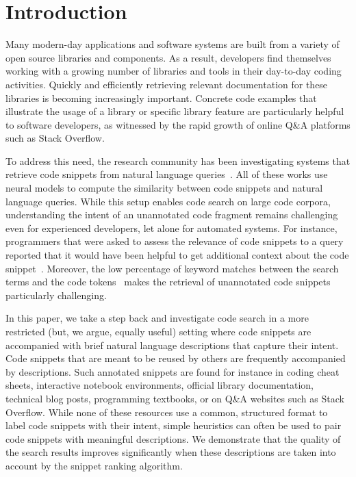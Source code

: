 \documentclass[12pt,conference, onecolumn]{IEEEtran}
\begin{document}
\section{Introduction}
Many modern-day applications and software systems are built from a variety of open source libraries and components. As a result, developers find themselves working with a growing number of libraries and tools in their day-to-day coding activities. Quickly and efficiently retrieving relevant documentation for these libraries is becoming increasingly important. Concrete code examples that illustrate the usage of a library or specific library feature are particularly helpful to software developers, as witnessed by the rapid growth of online Q\&A platforms such as Stack Overflow.

To address this need, the research community has been investigating systems that retrieve code snippets from natural language queries~\cite{gu2018deep, sachdev2018retrieval, cambronero2019deep, husain2019codesearchnet, yao2019coacor,Zhangyin:20}. All of these works use neural models to compute the similarity between code snippets and natural language queries. While this setup enables code search on large code corpora, understanding the intent of an unannotated code fragment remains challenging even for experienced developers, let alone for automated systems. For instance,  programmers that were asked to assess the relevance of code snippets to a query reported that it would have been helpful to get additional context about the code snippet~\cite{husain2019codesearchnet}. Moreover, the low percentage of keyword matches between the search terms and the code tokens~\cite{sachdev2018retrieval} makes the retrieval of unannotated code snippets particularly challenging.  

In this paper, we take a step back and investigate code search in a more restricted (but, we argue, equally useful) setting where code snippets are accompanied with brief natural language descriptions that capture their intent. Code snippets that are meant to be reused by others are frequently accompanied by descriptions. Such annotated snippets are found for instance in coding cheat sheets, interactive notebook environments, official library documentation, technical blog posts, programming textbooks, or on Q\&A websites such as Stack Overflow. While none of these resources use a common, structured format to label code snippets with their intent, simple heuristics can often be used to pair code snippets with meaningful descriptions. We demonstrate that the quality of the search results improves significantly when these descriptions are taken into account by the snippet ranking algorithm. 
\end{document}
